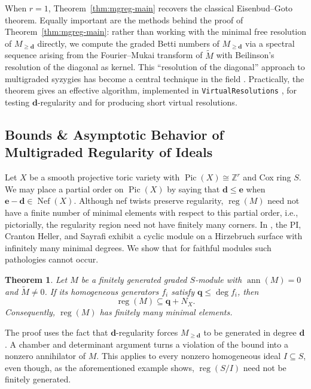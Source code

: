 \documentclass[11pt,reqno]{amsart}
\newtheorem{theorem}[lemma]{Theorem}
\theoremstyle{remark}
\newcommand{\reg}{\operatorname{reg}}
\newcommand{\ann}{\operatorname{ann}}
\newcommand{\Pic}{\operatorname{Pic}}
\newcommand{\Nef}{\operatorname{Nef}}
\newcommand{\dd}{\mathbf{d}}
\newcommand{\ee}{\mathbf{e}}
\newcommand{\qq}{\mathbf{q}}
\newcommand{\ZZ}{\mathbb{Z}}
\begin{document}
When $r=1$, Theorem~\ref{thm:mgreg-main} recovers the classical Eisenbud--Goto theorem. Equally important are the methods behind the proof of Theorem~\ref{thm:mgreg-main}: rather than working with the minimal free resolution of $M_{\geq\dd}$ directly, we compute the graded Betti numbers of $M_{\geq\dd}$ via a spectral sequence arising from the Fourier--Mukai transform of $\widetilde{M}$ with Beilinson's resolution of the diagonal as kernel. 
This ``resolution of the diagonal'' approach to multigraded syzygies has become a central technique in the field \cite{brownErmanTate,brownErman24-1,HHL24,brownSayrafi24}. Practically, the theorem gives an effective algorithm, implemented in \texttt{VirtualResolutions} \cite{ABLS20}, for testing $\dd$-regularity and for producing short virtual resolutions. 

\subsection{Bounds \& Asymptotic Behavior of Multigraded Regularity of Ideals}

Let $X$ be a smooth projective toric variety with $\Pic(X)\cong\ZZ^r$ and Cox ring $S$. We may place a partial order on $\Pic(X)$ by saying that $\dd\leq\ee$ when $\ee-\dd\in \Nef(X)$. Although nef twists preserve regularity, $\reg(M)$ need not have a finite number of minimal elements with respect to this partial order, i.e., pictorially, the regularity region need not have finitely many corners. In \cite[Example~1.1]{bruceHellerSayrafi22}, the PI, Cranton Heller, and Sayrafi exhibit a cyclic module on a Hirzebruch surface with infinitely many minimal degrees. We show that for faithful modules such pathologies cannot occur. 

\begin{theorem}\cite[Corollary~4.6]{bruceHellerSayrafi22}
Let $M$ be a finitely generated graded $S$-module with $\ann(M)=0$ and $\widetilde M\neq0$. If its homogeneous generators $f_i$ satisfy $\qq\leq\deg f_i$, then
\[
\reg(M)\subseteq\qq+N_X.
\]
Consequently, $\reg(M)$ has finitely many minimal elements.
\end{theorem}

The proof uses the fact that $\dd$-regularity forces $M_{\geq\dd}$ to be generated in degree $\dd$. A chamber and determinant argument turns a violation of the bound into a nonzero annihilator of $M$. This applies to every nonzero homogeneous ideal $I\subseteq S$, even though, as the aforementioned example shows, $\reg(S/I)$ need not be finitely generated. 
\end{document}
